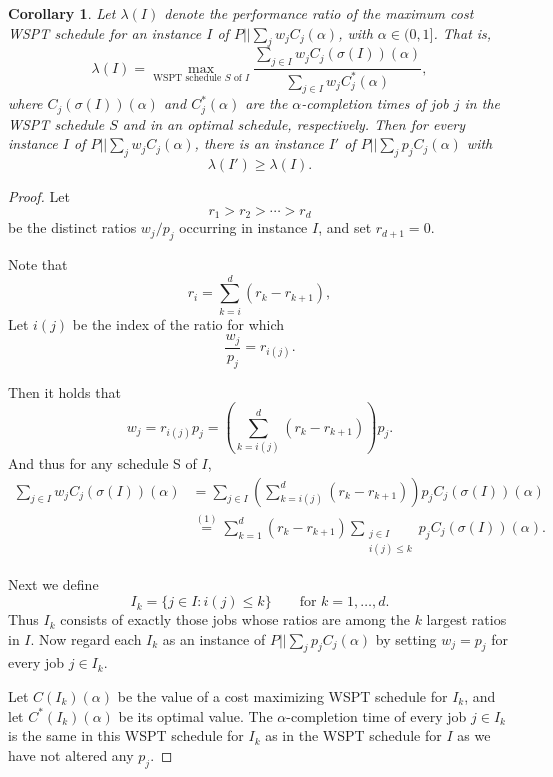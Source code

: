 \documentclass{article}
\newtheorem{corollary}{Corollary}
\begin{document}
\begin{corollary}
Let $\lambda(I)$ denote the performance ratio of the maximum cost WSPT schedule for an
instance $I$ of $P||\sum_j w_j C_j(\alpha)$, with $ \alpha \in (0,1]$. That is,
\[
        \lambda(I)
        =
        \max_{\text{WSPT schedule }S\text{ of }I}\frac{\sum_{j\in I} w_j C_j(\sigma(I))(\alpha)}
             {\sum_{j\in I} w_j C_j^*(\alpha)},
\]
where $C_j(\sigma(I))(\alpha)$ and $C_j^*(\alpha)$ are the $\alpha$-completion times of job $j$ in the WSPT
schedule  $S$ and in an optimal schedule, respectively. Then for every instance
$I$ of $P||\sum_j w_j C_j(\alpha)$, there is an instance $I'$ of
$P||\sum_j p_j C_j(\alpha)$ with
\[
        \lambda(I')\geq \lambda(I).
\]
\end{corollary}

\begin{proof}
Let
\[
        r_1>r_2>\cdots>r_d
\]
be the distinct ratios $w_j/p_j$ occurring in instance $I$, and set $r_{d+1}=0$.

Note that
\[
        r_i=\sum_{k=i}^d (r_k-r_{k+1}),
\]
Let $i(j)$ be the index  of the ratio for which
\[
        \frac{w_j}{p_j}=r_{i(j)}.
\]

Then it holds that
\[
        w_j
        =
        r_{i(j)}p_j
        =
        \left(\sum_{k=i(j)}^d (r_k-r_{k+1})\right)p_j .
\]
And thus for any schedule S of $I$,
\[
\begin{aligned}
        \sum_{j\in I} w_j C_j(\sigma(I))(\alpha)
        &=
        \sum_{j\in I}
        \left(
            \sum_{k=i(j)}^d (r_k-r_{k+1})
        \right)p_j C_j(\sigma(I))(\alpha)                                      \\
        &\overset{(1)}{=}
        \sum_{k=1}^d (r_k-r_{k+1})
        \sum_{\substack{j\in I\\ i(j)\leq k}} p_j C_j(\sigma(I))(\alpha) .
\end{aligned}
\]

Next we define
\[
        I_k=\{j\in I: i(j)\leq k\} \qquad \text{for } k=1,\ldots,d.
\]
Thus $I_k$ consists of exactly those jobs whose ratios are among the $k$
largest ratios in $I$. Now regard each $I_k$ as an instance of
$P||\sum_j p_j C_j(\alpha)$ by setting $w_j=p_j$ for every job $j\in I_k$.

Let $C(I_k)(\alpha)$ be the value of a cost maximizing WSPT schedule for $I_k$, and
let $C^*(I_k)(\alpha)$ be its optimal value.
The $\alpha$-completion time of every job $j\in I_k$ is the same in this WSPT schedule for
$I_k$ as in the WSPT schedule for $I$ as we have not altered any $p_j$.


\end{proof}
\end{document}
